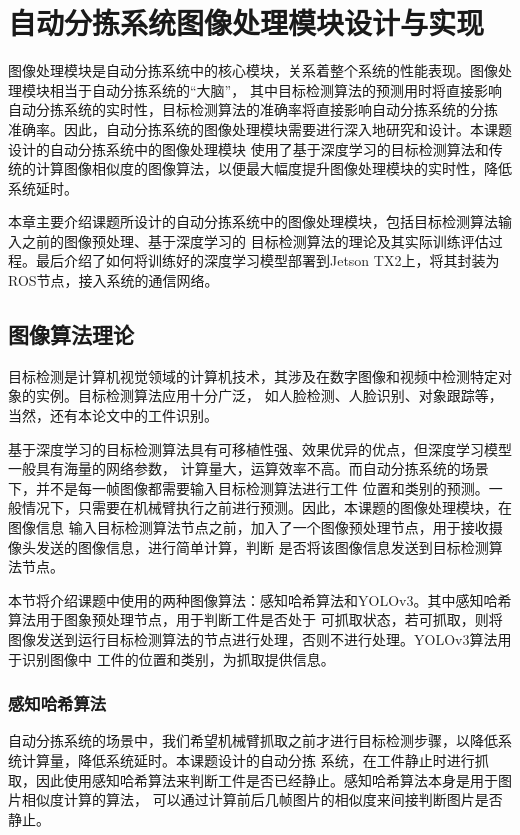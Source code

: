 \chapter{自动分拣系统图像处理模块设计与实现}
图像处理模块是自动分拣系统中的核心模块，关系着整个系统的性能表现。图像处理模块相当于自动分拣系统的“大脑”，
其中目标检测算法的预测用时将直接影响自动分拣系统的实时性，目标检测算法的准确率将直接影响自动分拣系统的分拣
准确率。因此，自动分拣系统的图像处理模块需要进行深入地研究和设计。本课题设计的自动分拣系统中的图像处理模块
使用了基于深度学习的目标检测算法和传统的计算图像相似度的图像算法，以便最大幅度提升图像处理模块的实时性，降低
系统延时。

本章主要介绍课题所设计的自动分拣系统中的图像处理模块，包括目标检测算法输入之前的图像预处理、基于深度学习的
目标检测算法的理论及其实际训练评估过程。最后介绍了如何将训练好的深度学习模型部署到Jetson TX2上，将其封装为
ROS节点，接入系统的通信网络。

\section{图像算法理论}
目标检测是计算机视觉领域的计算机技术，其涉及在数字图像和视频中检测特定对象的实例。目标检测算法应用十分广泛，
如人脸检测、人脸识别、对象跟踪等，当然，还有本论文中的工件识别。

基于深度学习的目标检测算法具有可移植性强、效果优异的优点，但深度学习模型一般具有海量的网络参数，
计算量大，运算效率不高。而自动分拣系统的场景下，并不是每一帧图像都需要输入目标检测算法进行工件
位置和类别的预测。一般情况下，只需要在机械臂执行之前进行预测。因此，本课题的图像处理模块，在图像信息
输入目标检测算法节点之前，加入了一个图像预处理节点，用于接收摄像头发送的图像信息，进行简单计算，判断
是否将该图像信息发送到目标检测算法节点。

本节将介绍课题中使用的两种图像算法：感知哈希算法\cite{ganzhihash}和YOLOv3。其中感知哈希算法用于图象预处理节点，用于判断工件是否处于
可抓取状态，若可抓取，则将图像发送到运行目标检测算法的节点进行处理，否则不进行处理。YOLOv3算法用于识别图像中
工件的位置和类别，为抓取提供信息。

\subsection{感知哈希算法}

自动分拣系统的场景中，我们希望机械臂抓取之前才进行目标检测步骤，以降低系统计算量，降低系统延时。本课题设计的自动分拣
系统，在工件静止时进行抓取，因此使用感知哈希算法来判断工件是否已经静止。感知哈希算法本身是用于图片相似度计算的算法，
可以通过计算前后几帧图片的相似度来间接判断图片是否静止。

